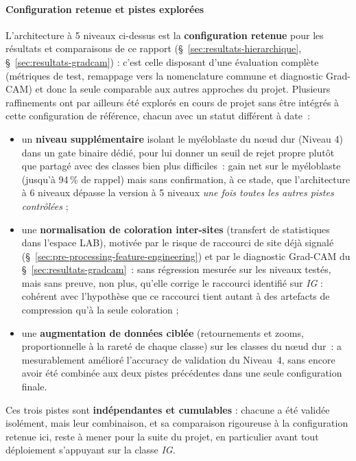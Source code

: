 \paragraph{Configuration retenue et pistes explorées}

L'architecture à 5 niveaux ci-dessus est la \textbf{configuration retenue} pour les résultats et comparaisons de ce rapport (\S~\ref{sec:resultats-hierarchique}, \S~\ref{sec:resultats-gradcam}) : c'est celle disposant d'une évaluation complète (métriques de test, remappage vers la nomenclature commune et diagnostic Grad-CAM) et donc la seule comparable aux autres approches du projet.
Plusieurs raffinements ont par ailleurs été explorés en cours de projet sans être intégrés à cette configuration de référence, chacun avec un statut différent à date~:
\begin{itemize}
  \item un \textbf{niveau supplémentaire} isolant le myéloblaste du n\oe{}ud dur (Niveau 4) dans un gate binaire dédié, pour lui donner un seuil de rejet propre plutôt que partagé avec des classes bien plus difficiles~: gain net sur le myéloblaste (jusqu'à 94\,\% de rappel) mais sans confirmation, à ce stade, que l'architecture à 6 niveaux dépasse la version à 5 niveaux \emph{une fois toutes les autres pistes contrôlées} ;
  \item une \textbf{normalisation de coloration inter-sites} (transfert de statistiques dans l'espace LAB), motivée par le risque de raccourci de site déjà signalé (\S~\ref{sec:pre-processing-feature-engineering}) et par le diagnostic Grad-CAM du \S~\ref{sec:resultats-gradcam}~: sans régression mesurée sur les niveaux testés, mais sans preuve, non plus, qu'elle corrige le raccourci identifié sur \emph{IG} : cohérent avec l'hypothèse que ce raccourci tient autant à des artefacts de compression qu'à la seule coloration ;
  \item une \textbf{augmentation de données ciblée} (retournements et zooms, proportionnelle à la rareté de chaque classe) sur les classes du n\oe{}ud dur~: a mesurablement amélioré l'accuracy de validation du Niveau~4, sans encore avoir été combinée aux deux pistes précédentes dans une seule configuration finale.
\end{itemize}  
Ces trois pistes sont \textbf{indépendantes et cumulables} : chacune a été validée isolément, mais leur combinaison, et sa comparaison rigoureuse à la configuration retenue ici, reste à mener pour la suite du projet, en particulier avant tout déploiement s'appuyant sur la classe \emph{IG}.

